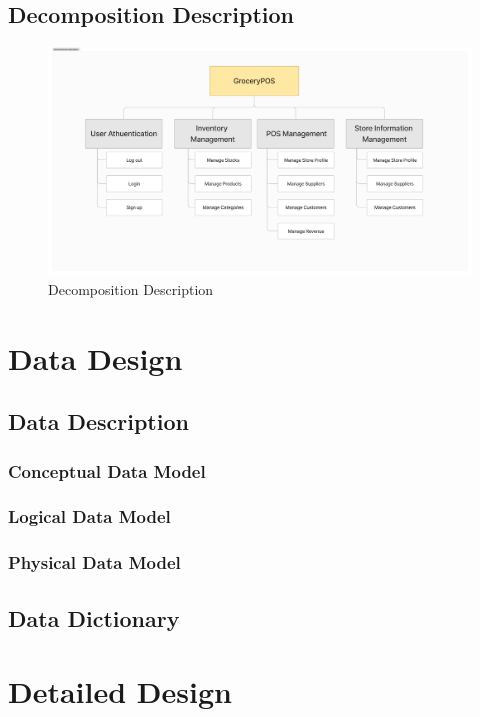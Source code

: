 \documentclass[../thesis.tex]{subfiles}
\begin{document}
\subsection{Decomposition Description}
\begin{figure}[H]
    \centering
    \includegraphics[width=1\textwidth]{images/Functional-Decomposition.png}
    \caption{Decomposition Description}
    \label{fig:functional-decomposition}
\end{figure}

\section{Data Design}
\subsection{Data Description}
\subsubsection{Conceptual Data Model}
\subsubsection{Logical Data Model}
\subsubsection{Physical Data Model}
\subsection{Data Dictionary}
\section{Detailed Design}
\end{document}
